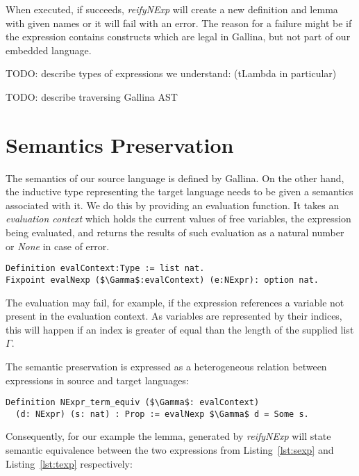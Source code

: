 \documentclass[sigplan]{acmart}\settopmatter{printfolios=true,printccs=false,printacmref=false}
\begin{document}
When executed, if succeeds, \emph{reifyNExp} will create a new
definition and lemma with given names or it will fail with an error.  The
reason for a failure might be if the expression contains constructs
which are legal in Gallina, but not part of our embedded language.

TODO: describe types of expressions we understand: (tLambda in
particular)

TODO: describe traversing Gallina AST

\section{Semantics Preservation}

The semantics of our source language is defined by Gallina. On the
other hand, the inductive type representing the target language needs
to be given a semantics associated with it. We do this by providing an
evaluation function. It takes an \textit{evaluation context} which
holds the current values of free variables, the expression being
evaluated, and returns the results of such evaluation as a natural
number or \emph{None} in case of error.

\begin{lstlisting}[language=Coq, mathescape=true,
  frame=single, basicstyle=\footnotesize]
Definition evalContext:Type := list nat.
Fixpoint evalNexp ($\Gamma$:evalContext) (e:NExpr): option nat.
\end{lstlisting}

The evaluation may fail, for example, if the expression references a
variable not present in the evaluation context. As variables are
represented by their indices, this will happen if an index is greater
of equal than the length of the supplied list $\Gamma$.

The semantic preservation is expressed as a heterogeneous relation
between expressions in source and target languages:

\begin{lstlisting}[language=Coq, mathescape=true,
  frame=single, basicstyle=\footnotesize]
Definition NExpr_term_equiv ($\Gamma$: evalContext)
  (d: NExpr) (s: nat) : Prop := evalNexp $\Gamma$ d = Some s.
\end{lstlisting}

Consequently, for our example the lemma, generated by \emph{reifyNExp}
will state semantic equivalence between the two expressions from
Listing~\ref{lst:sexp} and Listing~\ref{lst:texp} respectively:
\end{document}
